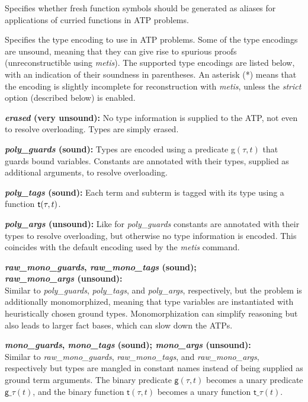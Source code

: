 \documentclass[a4paper,12pt]{article}
\newcommand\const[1]{\textsf{#1}}
\begin{document}
\begin{enum}
Specifies whether fresh function symbols should be generated as aliases for
applications of curried functions in ATP problems.

Specifies the type encoding to use in ATP problems. Some of the type encodings
are unsound, meaning that they can give rise to spurious proofs
(unreconstructible using \textit{metis}). The supported type encodings are
listed below, with an indication of their soundness in parentheses.
An asterisk (*) means that the encoding is slightly incomplete for
reconstruction with \textit{metis}, unless the \emph{strict} option (described
below) is enabled.

\begin{enum}
\item[\labelitemi] \textbf{\textit{erased} (very unsound):} No type information is
supplied to the ATP, not even to resolve overloading. Types are simply erased.

\item[\labelitemi] \textbf{\textit{poly\_guards} (sound):} Types are encoded using
a predicate \const{g}$(\tau, t)$ that guards bound
variables. Constants are annotated with their types, supplied as additional
arguments, to resolve overloading.

\item[\labelitemi] \textbf{\textit{poly\_tags} (sound):} Each term and subterm is
tagged with its type using a function $\const{t\/}(\tau, t)$.

\item[\labelitemi] \textbf{\textit{poly\_args} (unsound):}
Like for \textit{poly\_guards} constants are annotated with their types to
resolve overloading, but otherwise no type information is encoded. This
coincides with the default encoding used by the \textit{metis} command.

\item[\labelitemi]
\textbf{%
\textit{raw\_mono\_guards}, \textit{raw\_mono\_tags} (sound); \\
\textit{raw\_mono\_args} (unsound):} \\
Similar to \textit{poly\_guards}, \textit{poly\_tags}, and \textit{poly\_args},
respectively, but the problem is additionally monomorphized, meaning that type
variables are instantiated with heuristically chosen ground types.
Monomorphization can simplify reasoning but also leads to larger fact bases,
which can slow down the ATPs.

\item[\labelitemi]
\textbf{%
\textit{mono\_guards}, \textit{mono\_tags} (sound);
\textit{mono\_args} (unsound):} \\
Similar to
\textit{raw\_mono\_guards}, \textit{raw\_mono\_tags}, and
\textit{raw\_mono\_args}, respectively but types are mangled in constant names
instead of being supplied as ground term arguments. The binary predicate
$\const{g}(\tau, t)$ becomes a unary predicate
$\const{g\_}\tau(t)$, and the binary function
$\const{t}(\tau, t)$ becomes a unary function
$\const{t\_}\tau(t)$.


\end{enum}
\end{enum}
\end{document}
